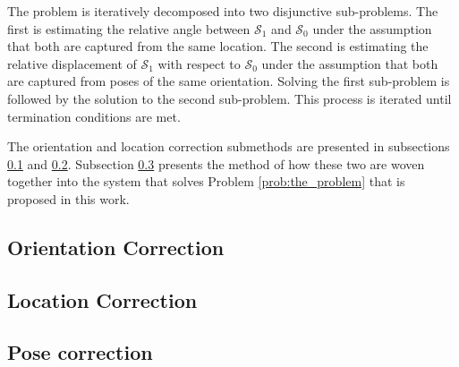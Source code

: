 The problem is iteratively decomposed into two disjunctive sub-problems. The
first is estimating the relative angle between $\mathcal{S}_1$ and
$\mathcal{S}_0$ under the assumption that both are captured from the same
location. The second is estimating the relative displacement of $\mathcal{S}_1$
with respect to $\mathcal{S}_0$ under the assumption that both are captured
from poses of the same orientation. Solving the first sub-problem is followed
by the solution to the second sub-problem. This process is iterated until
termination conditions are met.

The orientation and location correction submethods are presented in subsections
\ref{subsec:method_orientation_correction} and
\ref{subsec:method_location_correction}. Subsection
\ref{subsec:method_pose_correction} presents the method of how these two
are woven together into the system that solves Problem \ref{prob:the_problem}
that is proposed in this work.

\subsection{Orientation Correction}
  \label{subsec:method_orientation_correction}
  

\subsection{Location Correction}
  \label{subsec:method_location_correction}
  

\subsection{Pose correction}
  \label{subsec:method_pose_correction}
  
